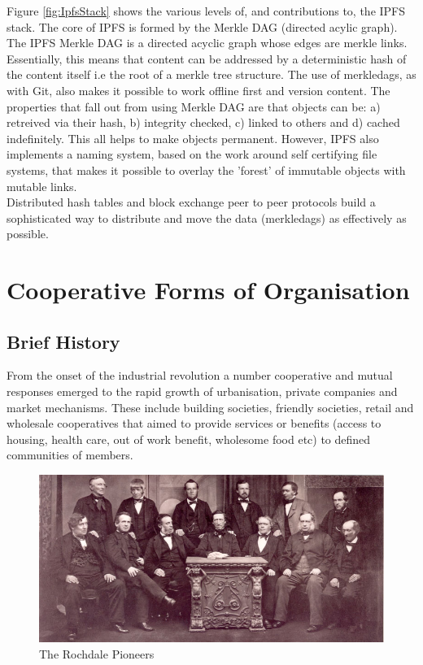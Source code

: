 Figure \ref{fig:IpfsStack} shows the various levels of, and contributions to, the IPFS stack. The core of IPFS is formed by the Merkle DAG (directed acylic graph). The IPFS Merkle DAG is a directed acyclic graph whose edges are merkle links. Essentially, this means that content can be addressed by a deterministic hash of the content itself i.e the root of a merkle tree structure. The use of merkledags, as with Git, also makes it possible to work offline first and version content. The properties that fall out from using Merkle DAG are that objects can be: a) retreived via their hash, b) integrity checked, c) linked to others and d) cached indefinitely. This all helps to make objects permanent. However, IPFS also implements a naming system, based on the work around self certifying file systems, that makes it possible to overlay the 'forest' of immutable objects with mutable links.\\ 

Distributed hash tables and block exchange peer to peer protocols build a sophisticated way to distribute and move the data (merkledags) as effectively as possible.

\section{Cooperative  Forms of Organisation}
\subsection{Brief History}
From the onset of  the industrial revolution a number cooperative and mutual responses emerged to the rapid growth of urbanisation, private companies and market mechanisms.  These include building societies, friendly societies, retail and wholesale cooperatives that aimed to provide services or benefits (access to housing, health care, out of work benefit, wholesome food etc) to defined communities of members.\\

\begin{figure}
\centering
\includegraphics[width=\textwidth]{Figures/rochdale_pioneers}
\decoRule
\caption[Rochdale Pioneers]{The Rochdale Pioneers}
\label{fig:pioneers}
\end{figure}

